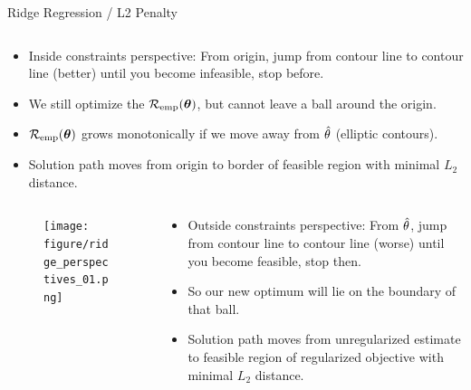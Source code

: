 \documentclass[11pt,compress,t,notes=noshow, xcolor=table]{beamer}
\begin{document}
\begin{vbframe}{Ridge Regression / L2 Penalty}
\begin{columns}
\begin{column}{0.5\textwidth}
\begin{footnotesize} 
\lz \lz
\begin{itemize}
  \item Inside constraints perspective: From origin, jump from contour line to contour line (better) until you become infeasible, stop before.
  \item We still optimize the $\mathcal{R}_{\text{emp}}(\bm{\theta})$, but cannot leave a ball around the origin.
  \item $\mathcal{R}_{\text{emp}}(\bm{\theta})$ grows monotonically if we move away from $\hat{\theta}$ (elliptic contours).
  \item Solution path moves from origin to border of feasible region with minimal $L_2$ distance.
\end{itemize}
\end{footnotesize}
\end{column}
\end{columns}


\framebreak

\begin{columns}
\begin{column}{0.5\textwidth}
\lz
\begin{figure}
\texttt{[image: figure/ridge\_perspectives\_01.png]}
\end{figure}
\end{column}

\begin{column}{0.5\textwidth}
\begin{footnotesize} 
\lz \lz
\begin{itemize}
	\item Outside constraints perspective: From $\hat{\theta}$, jump from contour line to contour line (worse) until you become feasible, stop then.
  \item So our new optimum will lie on the boundary of that ball.
  \item Solution path moves from unregularized estimate to feasible region of regularized objective with minimal $L_2$ distance.
\end{itemize}
\end{footnotesize}
\end{column}
\end{columns}

\framebreak


\end{vbframe}
\end{document}
